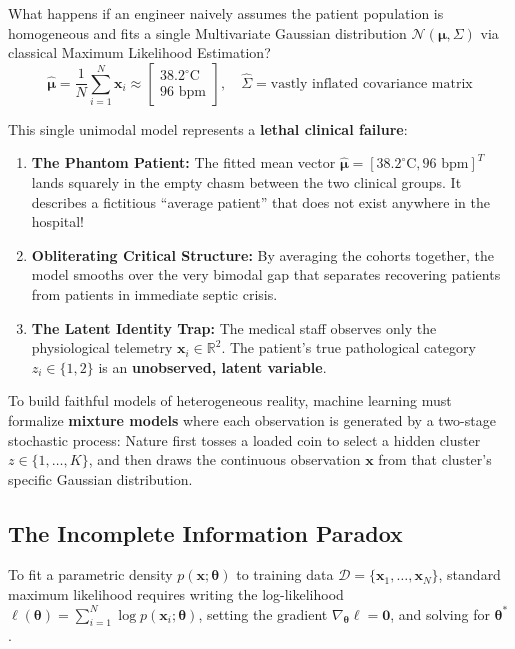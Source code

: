 What happens if an engineer naively assumes the patient population is homogeneous and fits a single Multivariate Gaussian distribution $\mathcal{N}(\boldsymbol{\mu}, \Sigma)$ via classical Maximum Likelihood Estimation?
\begin{equation}
\hat{\boldsymbol{\mu}} = \frac{1}{N}\sum_{i=1}^N \mathbf{x}_i \approx \begin{bmatrix} 38.2^\circ\text{C} \\ 96\text{ bpm} \end{bmatrix}, \quad \hat{\Sigma} = \text{vastly inflated covariance matrix}
\end{equation}

This single unimodal model represents a \textbf{lethal clinical failure}:
\begin{enumerate}
    \item \textbf{The Phantom Patient:} The fitted mean vector $\hat{\boldsymbol{\mu}} = [38.2^\circ\text{C}, 96\text{ bpm}]^T$ lands squarely in the empty chasm between the two clinical groups. It describes a fictitious ``average patient'' that does not exist anywhere in the hospital!
    \item \textbf{Obliterating Critical Structure:} By averaging the cohorts together, the model smooths over the very bimodal gap that separates recovering patients from patients in immediate septic crisis.
    \item \textbf{The Latent Identity Trap:} The medical staff observes only the physiological telemetry $\mathbf{x}_i \in \mathbb{R}^2$. The patient's true pathological category $z_i \in \{1, 2\}$ is an \textbf{unobserved, latent variable}.
\end{enumerate}

To build faithful models of heterogeneous reality, machine learning must formalize \textbf{mixture models} where each observation is generated by a two-stage stochastic process: Nature first tosses a loaded coin to select a hidden cluster $z \in \{1, \dots, K\}$, and then draws the continuous observation $\mathbf{x}$ from that cluster's specific Gaussian distribution.

\subsection{The Incomplete Information Paradox}
To fit a parametric density $p(\mathbf{x}; \boldsymbol{\theta})$ to training data $\mathcal{D} = \{\mathbf{x}_1, \dots, \mathbf{x}_N\}$, standard maximum likelihood requires writing the log-likelihood $\ell(\boldsymbol{\theta}) = \sum_{i=1}^N \log p(\mathbf{x}_i; \boldsymbol{\theta})$, setting the gradient $\nabla_{\boldsymbol{\theta}} \ell = \mathbf{0}$, and solving for $\boldsymbol{\theta}^*$.

